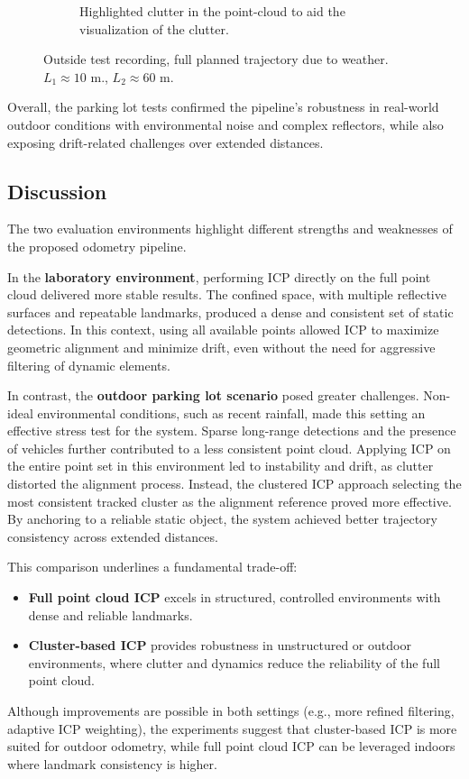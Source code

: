 \begin{figure}[!htbp]
\begin{subfigure}{0.48\linewidth}
        \caption{Highlighted clutter in the point-cloud to aid the visualization of the clutter.}
        \label{fig:highlightedClutter}
    \end{subfigure}
    \caption{Outside test recording, full planned trajectory due to weather. $L_1 \approx 10$ m., $L_2 \approx 60$ m. }
    \label{fig:outsideClutterRecording}
\end{figure}

Overall, the parking lot tests confirmed the pipeline's robustness in real-world outdoor conditions with environmental noise and complex reflectors, while also exposing drift-related challenges over extended distances.

\vspace{2\baselineskip}

\subsection{Discussion}
The two evaluation environments highlight different strengths and weaknesses of the proposed odometry pipeline.  

In the \textbf{laboratory environment}, performing ICP directly on the full point cloud delivered more stable results.  
The confined space, with multiple reflective surfaces and repeatable landmarks, produced a dense and consistent set of static detections.  
In this context, using all available points allowed ICP to maximize geometric alignment and minimize drift, even without the need for aggressive filtering of dynamic elements.  

In contrast, the \textbf{outdoor parking lot scenario} posed greater challenges.  
Non-ideal environmental conditions, such as recent rainfall, made this setting an effective stress test for the system.  
Sparse long-range detections and the presence of vehicles further contributed to a less consistent point cloud.  
Applying ICP on the entire point set in this environment led to instability and drift, as clutter distorted the alignment process.  
Instead, the clustered ICP approach selecting the most consistent tracked cluster as the alignment reference proved more effective.  
By anchoring to a reliable static object, the system achieved better trajectory consistency across extended distances.  

This comparison underlines a fundamental trade-off:
\begin{itemize}
    \item \textbf{Full point cloud ICP} excels in structured, controlled environments with dense and reliable landmarks.
    \item \textbf{Cluster-based ICP} provides robustness in unstructured or outdoor environments, where clutter and dynamics reduce the reliability of the full point cloud.
\end{itemize}

Although improvements are possible in both settings (e.g., more refined filtering, adaptive ICP weighting), the experiments suggest that cluster-based ICP is more suited for outdoor odometry, while full point cloud ICP can be leveraged indoors where landmark consistency is higher.
